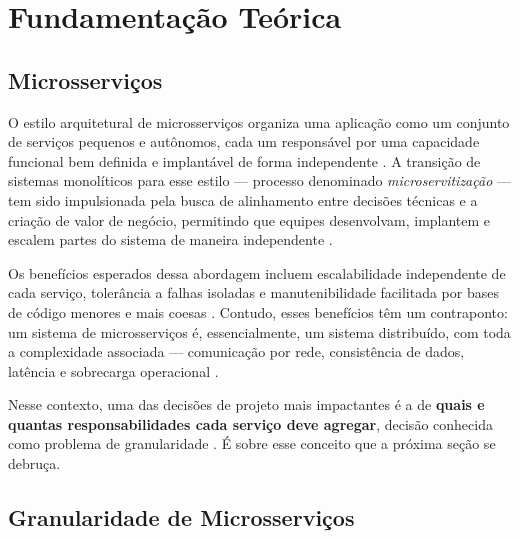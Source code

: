 
\chapter{Fundamentação Teórica}
\label{cap:fundamentacao}

\section{Microsserviços}
\label{sec:microsservicos}

O estilo arquitetural de microsserviços organiza uma aplicação como um conjunto de serviços pequenos e autônomos, cada um responsável por uma capacidade funcional bem definida e implantável de forma independente \cite{dragoni2018microservices, verarivera2021granularity}. A transição de sistemas monolíticos para esse estilo --- processo denominado \textit{microservitização} --- tem sido impulsionada pela busca de alinhamento entre decisões técnicas e a criação de valor de negócio, permitindo que equipes desenvolvam, implantem e escalem partes do sistema de maneira independente \cite{hassan2020microservice}.

Os benefícios esperados dessa abordagem incluem escalabilidade independente de cada serviço, tolerância a falhas isoladas e manutenibilidade facilitada por bases de código menores e mais coesas \cite{dragoni2018microservices, verarivera2021granularity}. Contudo, esses benefícios têm um contraponto: um sistema de microsserviços é, essencialmente, um sistema distribuído, com toda a complexidade associada --- comunicação por rede, consistência de dados, latência e sobrecarga operacional \cite{hassan2020microservice, dragoni2018microservices}.

Nesse contexto, uma das decisões de projeto mais impactantes é a de \textbf{quais e quantas responsabilidades cada serviço deve agregar}, decisão conhecida como problema de granularidade \cite{hassan2020microservice, verarivera2021granularity}. É sobre esse conceito que a próxima seção se debruça.

\section{Granularidade de Microsserviços}
\label{sec:granularidade}

